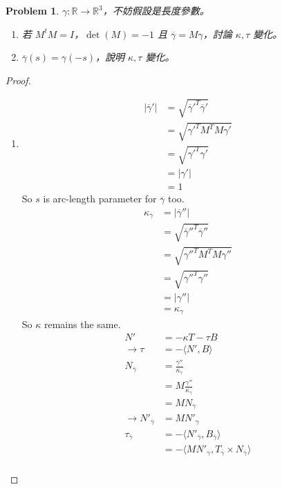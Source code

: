 \documentclass[10pt,a4paper]{article}
\newcounter{theProblemCounter}
\newtheorem{problem}[theProblemCounter]{Problem}
\begin{document}
\setcounter{theProblemCounter}{6}
\begin{problem}
$\gamma:\mathbb{R}\to\mathbb{R}^3$，不妨假設是長度參數。
\begin{enumerate}
\item[(b)] 若 $M^tM=I$，$\det(M)=-1$ 且 $\overline{\gamma}=M\gamma$，討論 $\kappa, \tau$ 變化。
\item[(c)] $\overline{\gamma}(s)=\gamma(-s)$，說明 $\kappa, \tau$ 變化。
\end{enumerate}
\end{problem}
\begin{proof}
\begin{enumerate}
\item[(b)]
\begin{align*}
\left|\overline{\gamma}'\right|&=\sqrt{\overline{\gamma}'^T\overline{\gamma}'}\\
&=\sqrt{\gamma'^TM^TM\gamma'}\\
&=\sqrt{\gamma'^T\gamma'}\\
&=\left|\gamma'\right|\\
&=1
\end{align*}
So $s$ is arc-length parameter for $\overline{\gamma}$ too.\\
\begin{align*}
\kappa_{\overline{\gamma}}&=\left|\overline{\gamma}''\right|\\
&=\sqrt{\overline{\gamma}''^T\overline{\gamma}''}\\
&=\sqrt{\gamma''^TM^TM\gamma''}\\
&=\sqrt{\gamma''^T\gamma''}\\
&=\left|\gamma''\right|\\
&=\kappa_{\gamma}
\end{align*}
So $\kappa$ remains the same.
\begin{align*}
N'&=-\kappa T-\tau B\\
\rightarrow \tau&=-\langle N',B\rangle\\
N_{\overline{\gamma}}&=\frac{\overline{\gamma}''}{\kappa_{\overline{\gamma}}}\\
&=M\frac{\gamma''}{\kappa_{\gamma}}\\
&=MN_{\gamma}\\
\rightarrow N'_{\overline{\gamma}}&=MN'_{\gamma}\\
\tau_{\overline{\gamma}}&=-\langle N'_{\overline{\gamma}},B_{\overline{\gamma}}\rangle\\
&=-\langle MN'_{\gamma},T_{\overline{\gamma}}\times N_{\overline{\gamma}}\rangle\\

\end{align*}
\end{enumerate}
\end{proof}
\end{document}
